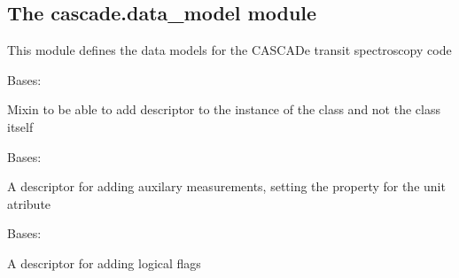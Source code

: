 \documentclass[a4paper,10pt,english]{sphinxmanual}
\begin{document}
\subsection{The cascade.data\_model module}
\label{\detokenize{cascade.data_model:module-cascade.data_model.data_model}}\label{\detokenize{cascade.data_model:the-cascade-data-model-module}}\label{\detokenize{cascade.data_model::doc}}
This module defines the data models for the CASCADe transit spectroscopy code

\begin{fulllineitems}
\label{\detokenize{cascade.data_model:cascade.data_model.data_model.InstanceDescriptorMixin}}
Bases: 

Mixin to be able to add descriptor to the instance of the class
and not the class itself

\end{fulllineitems}


\begin{fulllineitems}
\label{\detokenize{cascade.data_model:cascade.data_model.data_model.UnitDesc}}
Bases: 

A descriptor for adding auxilary measurements,
setting the property for the unit atribute

\end{fulllineitems}


\begin{fulllineitems}
\label{\detokenize{cascade.data_model:cascade.data_model.data_model.FlagDesc}}
Bases: 

A descriptor for adding logical flags

\end{fulllineitems}
\end{document}
